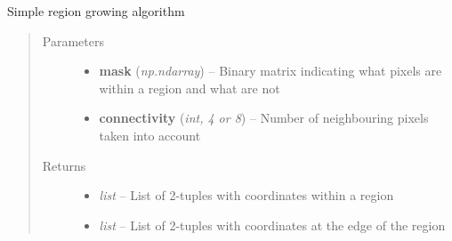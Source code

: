 \documentclass[letterpaper,10pt,english]{sphinxmanual}
\begin{document}
\begin{fulllineitems}
\label{segmentation:flamingo.segmentation.postprocess.region_growing}
Simple region growing algorithm
\begin{quote}\begin{description}
\item[{Parameters}] \leavevmode\begin{itemize}
\item {} 
\textbf{mask} (\emph{np.ndarray}) -- Binary matrix indicating what pixels are within a region and
what are not

\item {} 
\textbf{connectivity} (\emph{int, 4 or 8}) -- Number of neighbouring pixels taken into account

\end{itemize}

\item[{Returns}] \leavevmode
\begin{itemize}
\item {} 
\emph{list} --
List of 2-tuples with coordinates within a region

\item {} 
\emph{list} --
List of 2-tuples with coordinates at the edge of the region

\end{itemize}


\end{description}\end{quote}

\end{fulllineitems}

\end{document}
